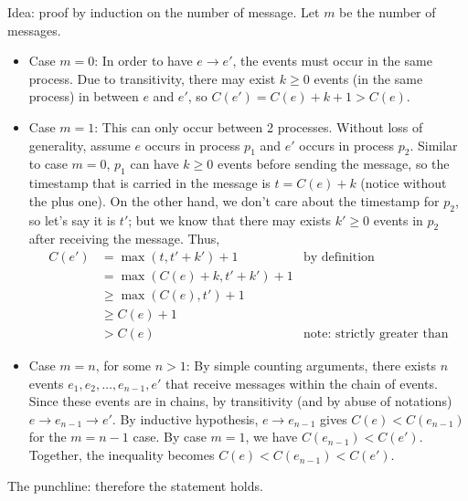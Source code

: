 Idea: proof by induction on the number of message. Let $m$ be the number of messages.

\begin{itemize}
\item
Case $m = 0$:
In order to have $e \rightarrow e'$, the events must occur in the same process.
Due to transitivity, there may exist $k \ge 0$ events (in the same process) in between $e$ and $e'$, so $C(e') = C(e) + k+1 > C(e)$.
\item
Case $m = 1$:
This can only occur between 2 processes.
Without loss of generality, assume $e$ occurs in process $p_1$ and $e'$ occurs in process $p_2$.
Similar to case $m=0$, $p_1$ can have $k \ge 0$ events before sending the message, so the timestamp that is carried in the message is $t = C(e) + k$ (notice without the plus one).
On the other hand, we don't care about the timestamp for $p_2$, so let's say it is $t'$; but we know that there may exists $k' \ge 0$ events in $p_2$ after receiving the message.
Thus,
\begin{align*}
C(e') &= \max(t, t' + k') + 1 & \text{by definition} \\
	&= \max(C(e) + k, t' + k') + 1 \\
	&\ge \max(C(e), t') + 1 \\
	&\ge C(e) + 1 \\
	&> C(e) & \text{note: strictly greater than}
\end{align*}
\item
Case $m = n$, for some $n > 1$:
By simple counting arguments, there exists $n$ events $e_1, e_2, \ldots, e_{n-1},e'$ that receive messages within the chain of events.
Since these events are in chains, by transitivity (and by abuse of notations) $e \rightarrow e_{n-1} \rightarrow e'$.
By inductive hypothesis, $e \rightarrow e_{n-1}$ gives $C(e) < C(e_{n-1})$ for the $m = n-1$ case.
By case $m = 1$, we have $C(e_{n-1}) < C(e')$.
Together, the inequality becomes $C(e) < C(e_{n-1}) < C(e')$.
\end{itemize}
The punchline: therefore the statement holds.
